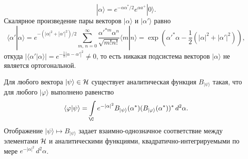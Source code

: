 \documentclass[a4paper
]{article}
\begin{document}
$$|\alpha\rangle=e^{-\alpha\alpha^*/2}e^{\alpha a^+}|0\rangle.$$
Скалярное произведение пары векторов $|\alpha\rangle$ и $|\alpha'\rangle$
равно $$\langle\alpha'|\alpha\rangle=e^{-(|\alpha|^2+|\alpha'|^2)/2}
\sum\limits_{m, \, n=0}^\infty \frac{\alpha'^{*m}\alpha^n}{\sqrt{m!n!}}
\langle m|n\rangle=\exp(\alpha'^*\alpha-\frac12(|\alpha|^2+|\alpha'|^2)),$$
откуда $|\langle\alpha'|\alpha\rangle|=e^{-\frac12|\alpha-\alpha'|^2}\ne 0$,
то есть никакая подсистема векторов $|\alpha\rangle$ не является
ортогональной. \par
\begin{Trm}
Для любого вектора $|\psi\rangle\in {\cal H}$ существует аналитическая
функция $B_{|\psi\rangle}$ такая, что для любого $|\varphi\rangle$
выполнено равенство
\begin{align}
\label{predst_a}
\langle \varphi|\psi\rangle=\int \limits_{\C}e^{-|\alpha|^2}B_{|\psi
\rangle}(\alpha^*)(B_{|\varphi\rangle}(\alpha^*))^*\, d^2\alpha.
\end{align}
Отображение $|\psi\rangle\mapsto B_{|\psi\rangle}$ задает
взаимно-однозначное соответствие между элементами ${\cal H}$ и аналитическими
функциями, квадратично-интегрируемыми по мере $e^{-|\alpha|^2}\, d^2\alpha$.
\end{Trm}
\end{document}

